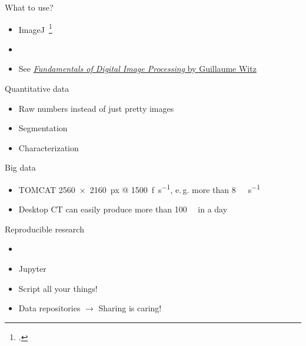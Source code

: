 \documentclass[aspectratio=169,10pt,draft]{beamer}
\newcommand{\eg}{e.\,g.\xspace}
\newcommand{\uct}{\si{\micro}CT\xspace}%
\begin{document}
\begin{frame}{What to use?}
	\begin{itemize}
		\item ImageJ~\footcite{Schindelin2012}
		\item \faPython%
		\item See \href{https://ilias.unibe.ch/goto_ilias3_unibe_sess_1561468.html}{\emph{Fundamentals of Digital Image Processing} by Guillaume Witz}
	\end{itemize}
\end{frame}

\begin{frame}{Quantitative data}
	\begin{itemize}
		\item Raw numbers instead of just pretty images
		\item Segmentation
		\item Characterization
	\end{itemize}
\end{frame}

\begin{frame}{Big data}
	\begin{itemize}
		\item TOMCAT \SI{2560x2160}{px} @ \SI{1500}{f\per\second}, \eg{} more than \SI{8}{\giga\byte\per\second}
		\item Desktop \uct{} can easily produce more than \SI{100}{\giga\byte} in a day
	\end{itemize}
\end{frame}

\begin{frame}{Reproducible research}
	\begin{itemize}
		\item \faGit%
		\item Jupyter
		\item Script all your things!
		\item Data repositories \(\rightarrow\) Sharing is caring!
	\end{itemize}
\end{frame}
\end{document}

